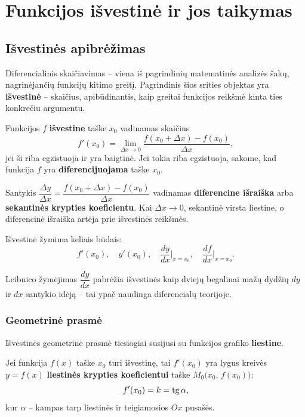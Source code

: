 \chapter{Funkcijos išvestinė ir jos taikymas}

\section{Išvestinės apibrėžimas}

Diferencialinis skaičiavimas – viena iš pagrindinių matematinės analizės šakų, nagrinėjančių funkcijų kitimo greitį. Pagrindinis šios srities objektas yra \textbf{išvestinė} – skaičius, apibūdinantis, kaip greitai funkcijos reikšmė kinta ties konkrečiu argumentu.

\begin{definition}
Funkcijos $f$ \textbf{išvestine} taške $x_0$ vadinamas skaičius
\[
f'(x_0) = \lim_{\Delta x \to 0} \frac{f(x_0 + \Delta x) - f(x_0)}{\Delta x},
\]
jei ši riba egzistuoja ir yra baigtinė. Jei tokia riba egzistuoja, sakome, kad funkcija $f$ yra \textbf{diferencijuojama} taške $x_0$.
\end{definition}

Santykis $\dfrac{\Delta y}{\Delta x} = \dfrac{f(x_0+\Delta x)-f(x_0)}{\Delta x}$ vadinamas \textbf{diferencine išraiška} arba \textbf{sekantinės krypties koeficientu}. Kai $\Delta x \to 0$, sekantinė virsta liestine, o diferencinė išraiška artėja prie išvestinės reikšmės.

\medskip
Išvestinė žymima keliais būdais:
\[
f'(x_0), \quad y'(x_0), \quad \frac{dy}{dx}\bigg|_{x=x_0}, \quad \frac{df}{dx}\bigg|_{x=x_0}.
\]

\begin{remark}
Leibnico žymėjimas $\dfrac{dy}{dx}$ pabrėžia išvestinės kaip dviejų begalinai mažų dydžių $dy$ ir $dx$ santykio idėją – tai ypač naudinga diferencialų teorijoje.
\end{remark}

\subsection{Geometrinė prasmė}

Išvestinės geometrinė prasmė tiesiogiai susijusi su funkcijos grafiko \textbf{liestine}.

\begin{tcolorbox}[colback=blue!5!white, colframe=blue!60!black, title=Geometrinė išvestinės prasmė]
Jei funkcija $f(x)$ taške $x_0$ turi išvestinę, tai $f'(x_0)$ yra lygus kreivės $y = f(x)$ \textbf{liestinės krypties koeficientui} taške $M_0\bigl(x_0,\, f(x_0)\bigr)$:
\[
f'(x_0) = k = \operatorname{tg}\alpha,
\]
kur $\alpha$ – kampas tarp liestinės ir teigiamosios $Ox$ pusašės.
\end{tcolorbox}

